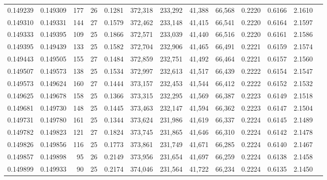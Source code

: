 \begin{tabular}{rrrrrrrrrrrrr}
0.149239 & 0.149309 & 177 &  26 &                                     0.1281 & 372,318 & 233,292 &  41,388 &  66,568 & 0.2220 & 0.6166 & 2.1610 \\
0.149310 & 0.149331 & 144 &  27 &                                     0.1579 & 372,462 & 233,148 &  41,415 &  66,541 & 0.2220 & 0.6164 & 2.1597 \\
0.149333 & 0.149395 & 109 &  25 &                                     0.1866 & 372,571 & 233,039 &  41,440 &  66,516 & 0.2220 & 0.6161 & 2.1586 \\
0.149395 & 0.149439 & 133 &  25 &                                     0.1582 & 372,704 & 232,906 &  41,465 &  66,491 & 0.2221 & 0.6159 & 2.1574 \\
0.149443 & 0.149505 & 155 &  27 &                                     0.1484 & 372,859 & 232,751 &  41,492 &  66,464 & 0.2221 & 0.6157 & 2.1560 \\
0.149507 & 0.149573 & 138 &  25 &                                     0.1534 & 372,997 & 232,613 &  41,517 &  66,439 & 0.2222 & 0.6154 & 2.1547 \\
0.149573 & 0.149624 & 160 &  27 &                                     0.1444 & 373,157 & 232,453 &  41,544 &  66,412 & 0.2222 & 0.6152 & 2.1532 \\
0.149625 & 0.149678 & 158 &  25 &                                     0.1366 & 373,315 & 232,295 &  41,569 &  66,387 & 0.2223 & 0.6149 & 2.1518 \\
0.149681 & 0.149730 & 148 &  25 &                                     0.1445 & 373,463 & 232,147 &  41,594 &  66,362 & 0.2223 & 0.6147 & 2.1504 \\
0.149731 & 0.149780 & 161 &  25 &                                     0.1344 & 373,624 & 231,986 &  41,619 &  66,337 & 0.2224 & 0.6145 & 2.1489 \\
0.149782 & 0.149823 & 121 &  27 &                                     0.1824 & 373,745 & 231,865 &  41,646 &  66,310 & 0.2224 & 0.6142 & 2.1478 \\
0.149826 & 0.149856 & 116 &  25 &                                     0.1773 & 373,861 & 231,749 &  41,671 &  66,285 & 0.2224 & 0.6140 & 2.1467 \\
0.149857 & 0.149898 &  95 &  26 &                                     0.2149 & 373,956 & 231,654 &  41,697 &  66,259 & 0.2224 & 0.6138 & 2.1458 \\
0.149899 & 0.149933 &  90 &  25 &                                     0.2174 & 374,046 & 231,564 &  41,722 &  66,234 & 0.2224 & 0.6135 & 2.1450 \\

\end{tabular}
